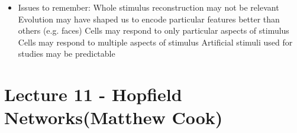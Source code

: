 \documentclass[english,11pt]{article}
\begin{document}
\begin{itemize}
\begin{figure}[H]
\begin{subfigure}[b]{0.5\textwidth}
				\caption{Stimulus estimation}
        \end{subfigure}
\end{figure}
\item Issues to remember:
\subitem Whole stimulus reconstruction may not be relevant
\subitem Evolution may have shaped us to encode particular features better than others (e.g. faces)
\subitem Cells may respond to only particular aspects of stimulus
\subitem Cells may respond to multiple aspects of stimulus
\subitem Artificial stimuli used for studies may be predictable
\end{itemize}

\section{Lecture 11 - Hopfield Networks(Matthew Cook)}
\end{document}
